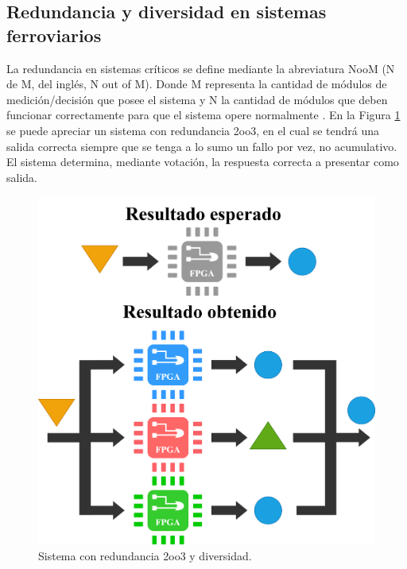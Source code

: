 \subsection{Redundancia y diversidad en sistemas ferroviarios}
	\label{sec:interlock2oo3}
	
	La redundancia en sistemas críticos se define mediante la abreviatura NooM (N de M, del inglés, N out of M). Donde M representa la cantidad de módulos de medición/decisión que posee el sistema y N la cantidad de módulos que deben funcionar correctamente para que el sistema opere normalmente \cite{Paper_12,Paper_41,Paper_47,Paper_78,Paper_80,Paper_82,Paper_84}. En la Figura \ref{fig:redundancia} se puede apreciar un sistema con redundancia 2oo3, en el cual se tendrá una salida correcta siempre que se tenga a lo sumo un fallo por vez, no acumulativo. El sistema determina, mediante votación, la respuesta correcta a presentar como salida.
	
	\begin{figure}[H]
		\centering
		\includegraphics[width=1\textwidth]{Figuras/redundancia.png}
		\centering\caption{Sistema con redundancia 2oo3 y diversidad.}
		\label{fig:redundancia}
	\end{figure}
	
